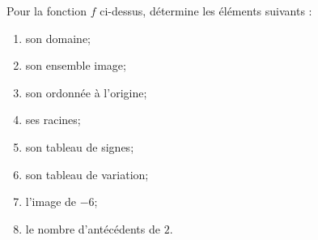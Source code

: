 %
%
    \begin{center}
        
    \end{center}
    Pour la fonction $f$ ci-dessus, détermine les éléments suivants :
    \begin{enumerate}[cols=2]
        \item son domaine;
        \item son ensemble image;
        \item son ordonnée à l'origine;
        \item ses racines;
        \item son tableau de signes;
        \item son tableau de variation;
        \item l'image de $-6$;
        \item le nombre d'antécédents de $2$.
    \end{enumerate}
